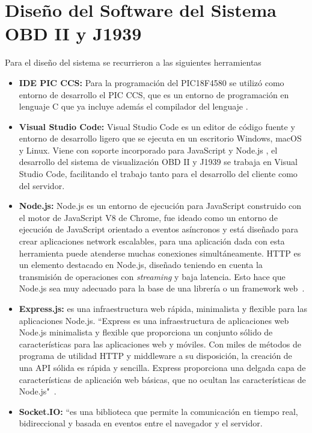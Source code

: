 \section {Diseño del Software del Sistema OBD II y J1939}
Para el diseño del sistema se recurrieron a las siguientes herramientas 
\begin{itemize}
    \item \textbf{IDE PIC CCS: } Para la programación del PIC18F4580 se utilizó como entorno de desarrollo el PIC CCS, que es un entorno de programación en lenguaje C que ya incluye además el compilador del lenguaje \cite{ccs}. 
    
    \item \textbf{Visual Studio Code:} Visual Studio Code es un editor de código fuente y entorno de desarrollo ligero que se ejecuta en un escritorio Windows, macOS y Linux. 
    Viene con soporte incorporado para JavaScript y  Node.js \cite{vsc}, el desarrollo del sistema de visualización OBD II y J1939 se trabaja en Visual Studio Code, facilitando el trabajo tanto para el desarrollo del cliente como del servidor. 
	\item {\bfseries Node.js: }	Node.js es un entorno de ejecución para JavaScript construido con el motor de JavaScript V8 de Chrome, fue ideado como un entorno de ejecución de JavaScript orientado a eventos asíncronos y está diseñado para crear aplicaciones network escalables, para una aplicación dada con esta herramienta puede atenderse muchas conexiones simultáneamente.
	HTTP es un elemento destacado en Node.js, diseñado teniendo en cuenta la transmisión de operaciones con \textit{streaming} y baja latencia. 
	Esto hace que Node.js sea muy adecuado para la base de una librería o un framework web~\cite{nodejs}.
	\item {\bfseries Express.js: } es una infraestructura web rápida, minimalista y flexible para las aplicaciones Node.js. ``Express es una infraestructura de aplicaciones web Node.js minimalista y flexible que proporciona un conjunto sólido de características para las aplicaciones web y móviles. 	
	Con miles de métodos de programa de utilidad HTTP y middleware a su disposición, la creación de una API sólida es rápida y sencilla. 
	Express proporciona una delgada capa de características de aplicación web básicas, que no ocultan las características de Node.js"~\cite{express}. %
	\item {\bfseries Socket.IO: } ``es una biblioteca que permite la comunicación en tiempo real, bidireccional y basada en eventos entre el navegador y el servidor. 

\end{itemize}
